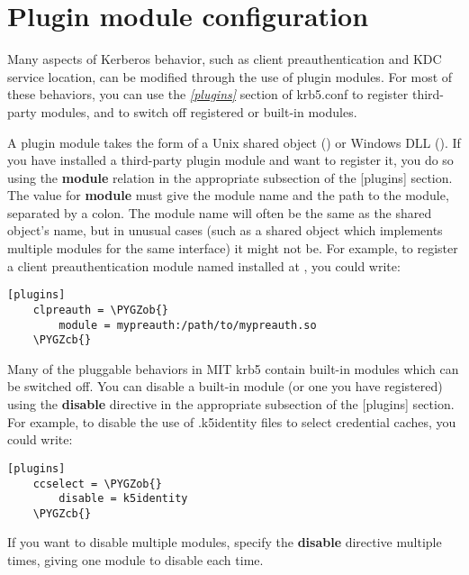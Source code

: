 \documentclass[letterpaper,10pt,english]{sphinxmanual}
\def\PYGZob{\char`\{}
\def\PYGZcb{\char`\}}
\begin{document}
\section{Plugin module configuration}
\label{admin/host_config:plugin-config}\label{admin/host_config:plugin-module-configuration}
Many aspects of Kerberos behavior, such as client preauthentication
and KDC service location, can be modified through the use of plugin
modules.  For most of these behaviors, you can use the {\hyperref[admin/conf_files/krb5_conf:plugins]{\emph{{[}plugins{]}}}}
section of krb5.conf to register third-party modules, and to switch
off registered or built-in modules.

A plugin module takes the form of a Unix shared object
() or Windows DLL ().  If you have
installed a third-party plugin module and want to register it, you do
so using the \textbf{module} relation in the appropriate subsection of the
{[}plugins{]} section.  The value for \textbf{module} must give the module name
and the path to the module, separated by a colon.  The module name
will often be the same as the shared object's name, but in unusual
cases (such as a shared object which implements multiple modules for
the same interface) it might not be.  For example, to register a
client preauthentication module named  installed at
, you could write:

\begin{Verbatim}[commandchars=\\\{\}]
[plugins]
    clpreauth = \PYGZob{}
        module = mypreauth:/path/to/mypreauth.so
    \PYGZcb{}
\end{Verbatim}

Many of the pluggable behaviors in MIT krb5 contain built-in modules
which can be switched off.  You can disable a built-in module (or one
you have registered) using the \textbf{disable} directive in the
appropriate subsection of the {[}plugins{]} section.  For example, to
disable the use of .k5identity files to select credential caches, you
could write:

\begin{Verbatim}[commandchars=\\\{\}]
[plugins]
    ccselect = \PYGZob{}
        disable = k5identity
    \PYGZcb{}
\end{Verbatim}

If you want to disable multiple modules, specify the \textbf{disable}
directive multiple times, giving one module to disable each time.
\end{document}

